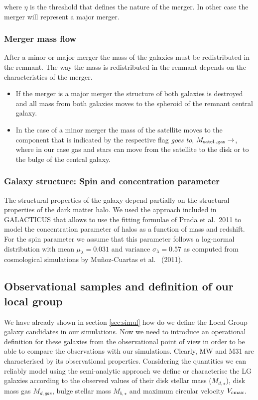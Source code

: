 \documentclass[useAMS,usenatbib]{mn2e}
\newcommand{\etal}{et al.~}
\begin{document}
where $\eta$ is the threshold that defines the nature of the
merger. In other case the merger will represent a major merger.


\subsubsection{Merger mass flow}

After a minor or major merger the mass of the galaxies must be
redistributed in the remnant. The way the mass is redistributed in the
remnant depends on the characteristics of the merger.

\begin{itemize}

\item
If the merger is a major merger the structure of both galaxies is
destroyed and all mass from both galaxies moves to the spheroid of the
remnant central galaxy.

\item
In the case of a minor merger the mass of the satellite moves to the
component that is indicated by the respective flag {\em goes to},
$M_{{\rm satel.,gas}}\to$, where in our case gas and stars can move
from the satellite to the disk or to the bulge of the central galaxy.

\end{itemize}


\subsubsection{Galaxy structure: Spin and concentration parameter}

The structural properties of the galaxy depend partially on the
structural properties of the dark matter halo. We used the approach
included in GALACTICUS that allows to use the fitting formulae of
Prada \etal 2011 to model the concentration parameter of halos as a
function of mass and redshift. For the spin parameter we assume that
this parameter follows a log-normal distribution with mean
$\mu_{\lambda} = 0.031$ and variance $\sigma_{\lambda} = 0.57$ as
computed from cosmological simulations by Mu\~noz-Cuartas \etal
(2011).


\subsection{Observational samples and definition of our local group}
\label{sec:LGdefine}

We have already shown in section \ref{sec:simul} how do we define the
Local Group galaxy candidates in our simulations. Now we need to
introduce an operational definition for these galaxies from the
observational point of view in order to be able to compare the
observations with our simulations. Clearly, MW and M31 are
characterised by its observational properties. Considering the
quantities we can reliably model using the semi-analytic approach we
define or characterise the LG galaxies according to the observed
values of their disk stellar mass ($M_{d,\star}$), disk mass gas
$M_{d,gas}$, bulge stellar mass $M_{b,\star}$ and maximum circular
velocity $V_{\rm cmax}$.
\end{document}
